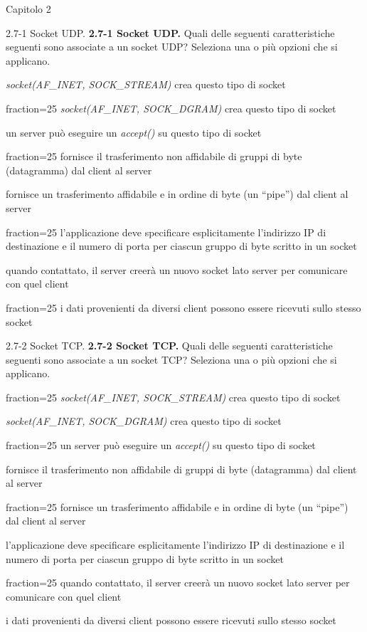 \documentclass[11pt]{article}
\begin{document}
\begin{quiz}{Capitolo 2}
\begin{multi}[points=1,shuffle,multiple]{2.7-1 Socket UDP.}
\textbf{2.7-1 Socket UDP.}
Quali delle seguenti caratteristiche seguenti sono associate a un socket UDP? Seleziona una o più opzioni che si applicano.
\item \emph{socket(AF\_INET, SOCK\_STREAM)} crea questo tipo di socket
\item[fraction=25] \emph{socket(AF\_INET, SOCK\_DGRAM)} crea questo tipo di socket
\item un server può eseguire un \emph{accept()} su questo tipo di socket
\item[fraction=25] fornisce il trasferimento non affidabile di gruppi di byte (datagramma) dal client al server
\item fornisce un trasferimento affidabile e in ordine di byte (un ``pipe'') dal client al server
\item[fraction=25] l'applicazione deve specificare esplicitamente l'indirizzo IP di destinazione e il numero di porta per ciascun gruppo di byte scritto in un socket
\item quando contattato, il server creerà un nuovo socket lato server per comunicare con quel client
\item[fraction=25] i dati provenienti da diversi client possono essere ricevuti sullo stesso socket
\end{multi}


\begin{multi}[points=1,shuffle,multiple]{2.7-2 Socket TCP.}
\textbf{2.7-2 Socket TCP.}
Quali delle seguenti caratteristiche seguenti sono associate a un socket TCP? Seleziona una o più opzioni che si applicano.
\item[fraction=25] \emph{socket(AF\_INET, SOCK\_STREAM)} crea questo tipo di socket
\item \emph{socket(AF\_INET, SOCK\_DGRAM)} crea questo tipo di socket
\item[fraction=25] un server può eseguire un \emph{accept()} su questo tipo di socket
\item fornisce il trasferimento non affidabile di gruppi di byte (datagramma) dal client al server
\item[fraction=25] fornisce un trasferimento affidabile e in ordine di byte (un ``pipe'') dal client al server
\item l'applicazione deve specificare esplicitamente l'indirizzo IP di destinazione e il numero di porta per ciascun gruppo di byte scritto in un socket
\item[fraction=25] quando contattato, il server creerà un nuovo socket lato server per comunicare con quel client
\item i dati provenienti da diversi client possono essere ricevuti sullo stesso socket
\end{multi}



\end{quiz}
\end{document}
